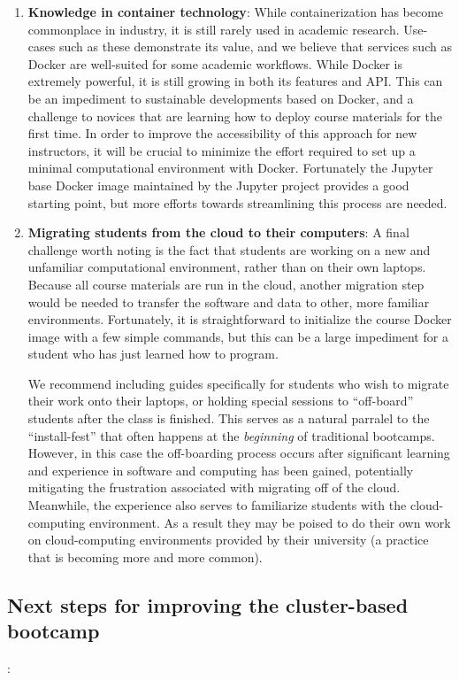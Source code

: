 \begin{enumerate}
\item {\bf Knowledge in container technology}: While containerization has become
commonplace in industry, it is still rarely used in academic research. Use-cases
such as these demonstrate its value, and we believe that services such as Docker
are well-suited for some academic workflows. While Docker is extremely powerful,
it is still growing in both its features and API. This can be an impediment to
sustainable developments based on Docker, and a challenge to novices that are
learning how to deploy course materials for the first time. In order to improve
the accessibility of this approach for new instructors, it will be crucial to
minimize the effort required to set up a minimal computational environment with
Docker. Fortunately the Jupyter base Docker image maintained by the Jupyter
project provides a good starting point, but more efforts towards streamlining
this process are needed.

\item {\bf Migrating students from the cloud to their computers}: A final
challenge worth noting is the fact that students are working on a new and
unfamiliar computational environment, rather than on their own laptops. Because
all course materials are run in the cloud, another migration step would be
needed to transfer the software and data to other, more familiar environments.
Fortunately, it is straightforward to initialize the course Docker image with a
few simple commands, but this can be a large impediment for a student who has
just learned how to program.

We recommend including guides specifically for
students who wish to migrate their work onto their laptops, or holding special
sessions to ``off-board'' students after the class is finished. This serves as a
natural parralel to the ``install-fest'' that often happens at the
\emph{beginning} of traditional bootcamps. However, in this case the
off-boarding process occurs after significant learning and experience in
software and computing has been gained, potentially mitigating the frustration
associated with migrating off of the cloud. Meanwhile, the experience also
serves to familiarize students with the cloud-computing environment. As a result
they may be poised to do their own work on cloud-computing environments
provided by their university (a practice that is becoming more and more common).

\end{enumerate}

\subsection{Next steps for improving the cluster-based bootcamp}:


